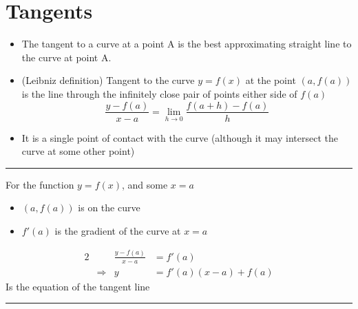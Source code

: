 \documentclass[11pt]{report}
\newcommand{\x}{0}
\begin{document}
\newpage
\section{Tangents}
\begin{itemize}
	\item The tangent to a curve at a point A is the best approximating straight line to the curve at point A.
	\item (Leibniz definition) Tangent to the curve $y=f(x)$ at the point $(a,f(a))$ is the line through the infinitely close pair of points either side of $f(a)$
	$$\frac{y-f(a)}{x-a} =\lim\limits_{h\to 0}\frac{f(a+h)-f(a)}{h}$$
	\item It is a single point of contact with the curve (although it may intersect the curve at some other point)
\end{itemize}\vspace{1cm}

\begin{center}
	

\vspace{1cm}



\hrule\vspace{0.5cm}
For the function $y=f(x)$, and some $x=a$
\begin{itemize}
\item $(a,f(a))$ is on the curve 
\item $f'(a)$ is the gradient of the curve at $x=a$
\end{itemize}
\Large
\begin{alignat*}{2}
&&\frac{y-f(a)}{x-a}&=f'(a) \\
&\Rightarrow& y&= f'(a)(x-a) + f(a)
\end{alignat*}
\normalsize
Is the equation of the tangent line
\vspace{0.5cm}\hrule
\end{center}
\newpage
\end{document}

